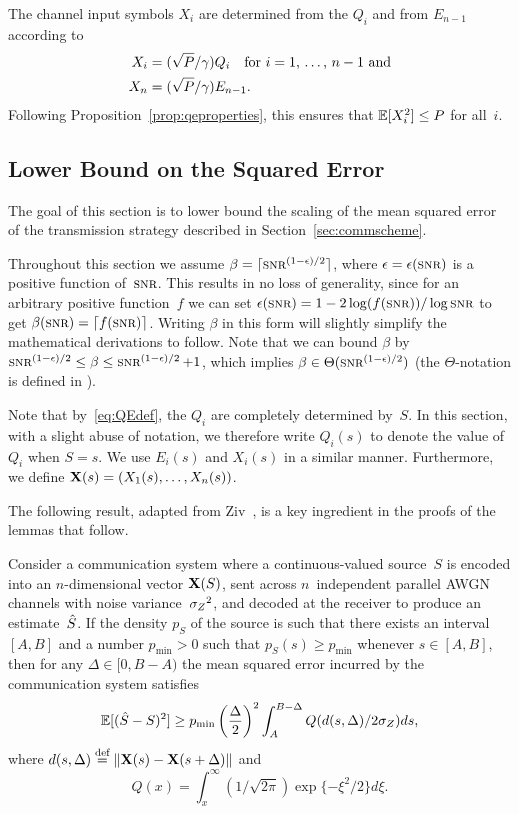 The channel input symbols $X_i$ are determined from the $Q_i$ and from $E_{n-1}$
according to 
\begin{align}
  X_i &= (\sqrt{P}/\gamma) Q_i \quad
  \text{for $i = 1$, \dots, $n-1$ and} \nonumber\\
  X_n &= (\sqrt{P}/\gamma) E_{n-1}.
  \label{eq:Xdef}
\end{align}
Following Proposition~\ref{prop:qeproperties}, this ensures that $\mathbb{E}[X_i^2] \le
P$ for all~$i$. 


\subsection{Lower Bound on the Squared Error}\label{sec:scalarlowerbound}

The goal of this section is to lower bound the scaling of the mean squared error
of the transmission strategy described in Section~\ref{sec:commscheme}.

\begin{remark}
  \label{rem:betaepswlog}
  Throughout this section we assume $\beta = \lceil \snr^{(1-\e)/2}\rceil$,
  where $\e = \e(\snr)$ is a positive function of~$\snr$. This results in no
  loss of generality, since for an arbitrary positive function~$f$ we can set
  $\e(\snr) = 1-2 \log(f(\snr))/\log\snr$ to get $\beta(\snr) = \lceil f(\snr)
  \rceil$.  Writing $\beta$ in this form will slightly simplify the mathematical
  derivations to follow. Note that we can bound $\beta$ by $\snr^{(1-\e)/2} \le
  \beta \le \snr^{(1-\e)/2} + 1$, which implies $\beta \in
  \Theta(\snr^{(1-\e)/2})$ (the $\Theta$-notation is defined in
  ).
\end{remark}

Note that by~\eqref{eq:QEdef}, the $Q_i$ are completely determined by~$S$.
In this section, with a slight abuse of notation, we therefore write $Q_i(s)$ to
denote the value of~$Q_i$ when $S = s$. We use $E_i(s)$ and $X_i(s)$ in a
similar manner. Furthermore, we define $\mathbf{X}(s) = (X_1(s), \dots, X_n(s))$.

The following result, adapted from Ziv~\cite{Ziv1970}, is a key ingredient in
the proofs of the lemmas that follow.

\begin{lemma}
  \label{lem:zivbound}
  Consider a communication system where a con\-tin\-u\-ous-valued source~$S$ is
  encoded into an $n$-dimensional vector $\mathbf{X}(S)$, sent across $n$~independent
  parallel AWGN channels with noise variance~${{\sigma_Z}^2}$, and decoded at the receiver
  to produce an estimate~${\hat{S}}$.  If the density $p_S$ of the source is such that
  there exists an interval $[A,B]$ and a number $p_{\min} > 0$ such that $p_S(s)
  \ge p_{\min}$ whenever $s \in [A,B]$, then for any $\Delta \in [0,B-A)$ the
  mean squared error incurred by the communication system satisfies
  \begin{equation}
    \label{eq:zivbound}
    \mathbb{E}[({\hat{S}} - S)^2] \ge p_{\min} \left(\frac{\Delta}{2} \right)^2 
    \int_A^{B-\Delta} Q(d(s, \Delta) / 2 {\sigma_Z}) ds,
  \end{equation}
  where $d(s, \Delta) \stackrel{\text{def}}{=} \|\mathbf{X}(s) - \mathbf{X}(s+\Delta)\|$ and 
  \[Q(x) = \int_x^{\infty} (1/\sqrt{2\pi}) \exp\{-\xi^2/2\} d\xi.\]
\end{lemma}

